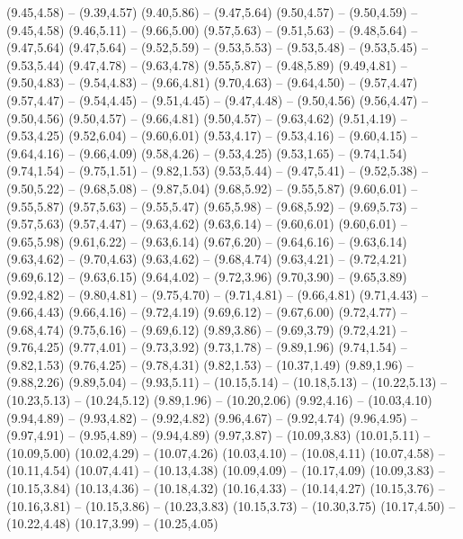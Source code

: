 {  (9.45,4.58) -- (9.39,4.57)
  (9.40,5.86) -- (9.47,5.64)
  (9.50,4.57) -- (9.50,4.59) -- (9.45,4.58)
  (9.46,5.11) -- (9.66,5.00)
  (9.57,5.63) -- (9.51,5.63) -- (9.48,5.64) -- (9.47,5.64)
  (9.47,5.64) -- (9.52,5.59) -- (9.53,5.53) -- (9.53,5.48) -- (9.53,5.45) -- (9.53,5.44)
  (9.47,4.78) -- (9.63,4.78)
  (9.55,5.87) -- (9.48,5.89)
  (9.49,4.81) -- (9.50,4.83) -- (9.54,4.83) -- (9.66,4.81)
  (9.70,4.63) -- (9.64,4.50) -- (9.57,4.47)
  (9.57,4.47) -- (9.54,4.45) -- (9.51,4.45) -- (9.47,4.48) -- (9.50,4.56)
  (9.56,4.47) -- (9.50,4.56)
  (9.50,4.57) -- (9.66,4.81)
  (9.50,4.57) -- (9.63,4.62)
  (9.51,4.19) -- (9.53,4.25)
  (9.52,6.04) -- (9.60,6.01)
  (9.53,4.17) -- (9.53,4.16) -- (9.60,4.15) -- (9.64,4.16) -- (9.66,4.09)
  (9.58,4.26) -- (9.53,4.25)
  (9.53,1.65) -- (9.74,1.54)
  (9.74,1.54) -- (9.75,1.51) -- (9.82,1.53)
  (9.53,5.44) -- (9.47,5.41) -- (9.52,5.38) -- (9.50,5.22) -- (9.68,5.08) -- (9.87,5.04)
  (9.68,5.92) -- (9.55,5.87)
  (9.60,6.01) -- (9.55,5.87)
  (9.57,5.63) -- (9.55,5.47)
  (9.65,5.98) -- (9.68,5.92) -- (9.69,5.73) -- (9.57,5.63)
  (9.57,4.47) -- (9.63,4.62)
  (9.63,6.14) -- (9.60,6.01)
  (9.60,6.01) -- (9.65,5.98)
  (9.61,6.22) -- (9.63,6.14)
  (9.67,6.20) -- (9.64,6.16) -- (9.63,6.14)
  (9.63,4.62) -- (9.70,4.63)
  (9.63,4.62) -- (9.68,4.74)
  (9.63,4.21) -- (9.72,4.21)
  (9.69,6.12) -- (9.63,6.15)
  (9.64,4.02) -- (9.72,3.96)
  (9.70,3.90) -- (9.65,3.89)
  (9.92,4.82) -- (9.80,4.81) -- (9.75,4.70) -- (9.71,4.81) -- (9.66,4.81)
  (9.71,4.43) -- (9.66,4.43)
  (9.66,4.16) -- (9.72,4.19)
  (9.69,6.12) -- (9.67,6.00)
  (9.72,4.77) -- (9.68,4.74)
  (9.75,6.16) -- (9.69,6.12)
  (9.89,3.86) -- (9.69,3.79)
  (9.72,4.21) -- (9.76,4.25)
  (9.77,4.01) -- (9.73,3.92)
  (9.73,1.78) -- (9.89,1.96)
  (9.74,1.54) -- (9.82,1.53)
  (9.76,4.25) -- (9.78,4.31)
  (9.82,1.53) -- (10.37,1.49)
  (9.89,1.96) -- (9.88,2.26)
  (9.89,5.04) -- (9.93,5.11) -- (10.15,5.14) -- (10.18,5.13) -- (10.22,5.13) -- (10.23,5.13) -- (10.24,5.12)
  (9.89,1.96) -- (10.20,2.06)
  (9.92,4.16) -- (10.03,4.10)
  (9.94,4.89) -- (9.93,4.82) -- (9.92,4.82)
  (9.96,4.67) -- (9.92,4.74)
  (9.96,4.95) -- (9.97,4.91) -- (9.95,4.89) -- (9.94,4.89)
  (9.97,3.87) -- (10.09,3.83)
  (10.01,5.11) -- (10.09,5.00)
  (10.02,4.29) -- (10.07,4.26)
  (10.03,4.10) -- (10.08,4.11)
  (10.07,4.58) -- (10.11,4.54)
  (10.07,4.41) -- (10.13,4.38)
  (10.09,4.09) -- (10.17,4.09)
  (10.09,3.83) -- (10.15,3.84)
  (10.13,4.36) -- (10.18,4.32)
  (10.16,4.33) -- (10.14,4.27)
  (10.15,3.76) -- (10.16,3.81) -- (10.15,3.86) -- (10.23,3.83)
  (10.15,3.73) -- (10.30,3.75)
  (10.17,4.50) -- (10.22,4.48)
  (10.17,3.99) -- (10.25,4.05)
}
